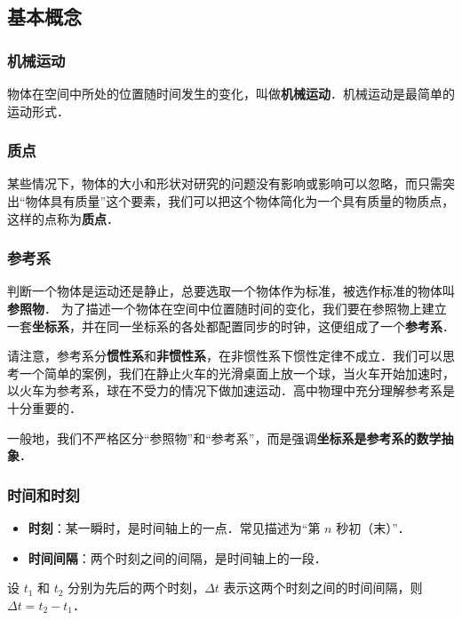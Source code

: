 

\subsection{基本概念}

\subsubsection{机械运动}
物体在空间中所处的位置随时间发生的变化，叫做\textbf{机械运动}．机械运动是最简单的运动形式．

\subsubsection{质点}
某些情况下，物体的大小和形状对研究的问题没有影响或影响可以忽略，而只需突出“物体具有质量”这个要素，我们可以把这个物体简化为一个具有质量的物质点，这样的点称为\textbf{质点}．

\subsubsection{参考系}
判断一个物体是运动还是静止，总要选取一个物体作为标准，被选作标准的物体叫\textbf{参照物}．
为了描述一个物体在空间中位置随时间的变化，我们要在参照物上建立一套\textbf{坐标系}，并在同一坐标系的各处都配置同步的时钟，这便组成了一个\textbf{参考系}．

请注意，参考系分\textbf{惯性系}和\textbf{非惯性系}，在非惯性系下惯性定律不成立．我们可以思考一个简单的案例，我们在静止火车的光滑桌面上放一个球，当火车开始加速时，以火车为参考系，球在不受力的情况下做加速运动．高中物理中充分理解参考系是十分重要的．

一般地，我们不严格区分“参照物”和“参考系”，而是强调\textbf{坐标系是参考系的数学抽象}．

\subsubsection{时间和时刻}
\begin{itemize}
\item \textbf{时刻}：某一瞬时，是时间轴上的一点．常见描述为“第 $n$ 秒初（末）”．
\item \textbf{时间间隔}：两个时刻之间的间隔，是时间轴上的一段．
\end{itemize}

设 $t_1$ 和 $t_2$ 分别为先后的两个时刻，$\Delta t$ 表示这两个时刻之间的时间间隔，则 $\Delta t = t_2 - t_1$．

